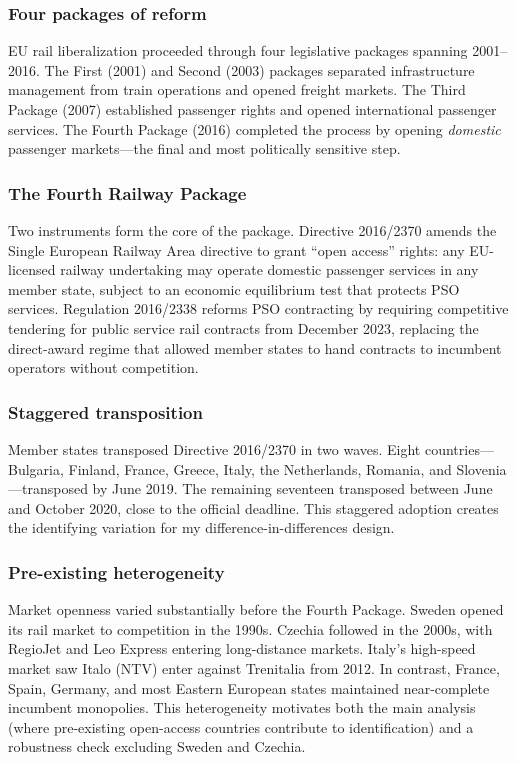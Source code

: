 \documentclass[12pt]{article}
\begin{document}
\subsubsection*{Four packages of reform} EU rail liberalization proceeded through four legislative packages spanning 2001--2016. The First (2001) and Second (2003) packages separated infrastructure management from train operations and opened freight markets. The Third Package (2007) established passenger rights and opened international passenger services. The Fourth Package (2016) completed the process by opening \textit{domestic} passenger markets---the final and most politically sensitive step.

\subsubsection*{The Fourth Railway Package} Two instruments form the core of the package. Directive 2016/2370 amends the Single European Railway Area directive to grant ``open access'' rights: any EU-licensed railway undertaking may operate domestic passenger services in any member state, subject to an economic equilibrium test that protects PSO services. Regulation 2016/2338 reforms PSO contracting by requiring competitive tendering for public service rail contracts from December 2023, replacing the direct-award regime that allowed member states to hand contracts to incumbent operators without competition.

\subsubsection*{Staggered transposition} Member states transposed Directive 2016/2370 in two waves. Eight countries---Bulgaria, Finland, France, Greece, Italy, the Netherlands, Romania, and Slovenia---transposed by June 2019. The remaining seventeen transposed between June and October 2020, close to the official deadline. This staggered adoption creates the identifying variation for my difference-in-differences design.

\subsubsection*{Pre-existing heterogeneity} Market openness varied substantially before the Fourth Package. Sweden opened its rail market to competition in the 1990s. Czechia followed in the 2000s, with RegioJet and Leo Express entering long-distance markets. Italy's high-speed market saw Italo (NTV) enter against Trenitalia from 2012. In contrast, France, Spain, Germany, and most Eastern European states maintained near-complete incumbent monopolies. This heterogeneity motivates both the main analysis (where pre-existing open-access countries contribute to identification) and a robustness check excluding Sweden and Czechia.
\end{document}
